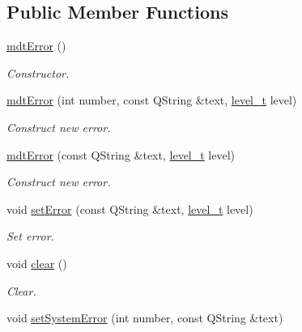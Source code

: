 \subsection*{Public Member Functions}
\begin{DoxyCompactItemize}
\item 
\hypertarget{classmdt_error_a78824dc8c0029107949baaf28c4a9df5}{
\hyperlink{classmdt_error_a78824dc8c0029107949baaf28c4a9df5}{mdtError} ()}
\label{classmdt_error_a78824dc8c0029107949baaf28c4a9df5}

\begin{DoxyCompactList}\small\item\em Constructor. \end{DoxyCompactList}\item 
\hyperlink{classmdt_error_a377c175cc8e1aeae543cae2ecc5ca87b}{mdtError} (int number, const QString \&text, \hyperlink{classmdt_error_a5c8b1a040e2feaa848f6201d6b6f0cd7}{level\_\-t} level)
\begin{DoxyCompactList}\small\item\em Construct new error. \end{DoxyCompactList}\item 
\hypertarget{classmdt_error_a775542a251ef746f3433e7d790a48d85}{
\hyperlink{classmdt_error_a775542a251ef746f3433e7d790a48d85}{mdtError} (const QString \&text, \hyperlink{classmdt_error_a5c8b1a040e2feaa848f6201d6b6f0cd7}{level\_\-t} level)}
\label{classmdt_error_a775542a251ef746f3433e7d790a48d85}

\begin{DoxyCompactList}\small\item\em Construct new error. \end{DoxyCompactList}\item 
void \hyperlink{classmdt_error_a8e7961a665841c1b052116e4dd2eb855}{setError} (const QString \&text, \hyperlink{classmdt_error_a5c8b1a040e2feaa848f6201d6b6f0cd7}{level\_\-t} level)
\begin{DoxyCompactList}\small\item\em Set error. \end{DoxyCompactList}\item 
\hypertarget{classmdt_error_a9fa7eb879fe7b26c4a4f0bd55fe29ffa}{
void \hyperlink{classmdt_error_a9fa7eb879fe7b26c4a4f0bd55fe29ffa}{clear} ()}
\label{classmdt_error_a9fa7eb879fe7b26c4a4f0bd55fe29ffa}

\begin{DoxyCompactList}\small\item\em Clear. \end{DoxyCompactList}\item 
\hypertarget{classmdt_error_a49254fdb566fee1a4adafe6a3694befc}{
void \hyperlink{classmdt_error_a49254fdb566fee1a4adafe6a3694befc}{setSystemError} (int number, const QString \&text)}
\label{classmdt_error_a49254fdb566fee1a4adafe6a3694befc}


\end{DoxyCompactItemize}
